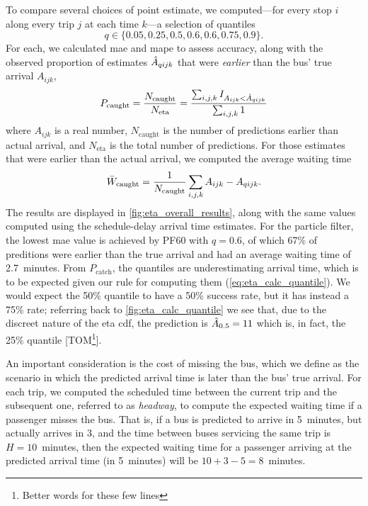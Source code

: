 To compare several choices of point estimate, we computed---for every stop $i$ along every trip $j$ at each time $k$---a selection of quantiles
\[
  q \in \{0.05, 0.25, 0.5, 0.6, 0.6, 0.75, 0.9\}.
\]
For each, we calculated \gls{mae} and \gls{mape} to assess accuracy, along with the observed proportion of estimates $\hat{A}_{qijk}$ that were \emph{earlier} than the bus' true arrival $A_{ijk}$,
\begin{equation}
\label{eq:pr_bus_caught}
P_\text{caught} = \frac{N_\text{caught}}{N_\text{eta}}
= \frac{\sum_{i,j,k} I_{A_{ijk} < \hat{A}_{qijk}}}{\sum_{i,j,k} 1}
\end{equation}
where $A_{ijk}$ is a real number, $N_\text{caught}$ is the number of predictions earlier than actual arrival, and $N_\text{eta}$ is the total number of predictions. For those estimates that were earlier than the actual arrival, we computed the average waiting time
\begin{equation}
\label{eq:avg_wait_time}
\bar W_\text{caught} =
\frac{1}{N_\text{caught}} \sum_{i,j,k} A_{ijk} - A_{qijk}.
\end{equation}
The results are displayed in \cref{fig:eta_overall_results}, along with the same values computed using the schedule-delay arrival time estimates. For the particle filter, the lowest \gls{mae} value is achieved by PF60 with $q = 0.6$, of which 67\% of preditions were earlier than the true arrival and had an average waiting time of 2.7~minutes. From $P_\text{catch}$, the quantiles are underestimating arrival time, which is to be expected given our rule for computing them (\cref{eq:eta_calc_quantile}). We would expect the 50\% quantile to have a 50\% success rate, but it has instead a 75\% rate; referring back to \cref{fig:eta_calc_quantile} we see that, due to the discreet nature of the \gls{eta} \gls{cdf}, the prediction is $\hat{A}_{0.5} = 11$ which is, in fact, the 25\% quantile [TOM\footnote{Better words for these few lines}].



An important consideration is the cost of missing the bus, which we define as the scenario in which the predicted arrival time is later than the bus' true arrival. For each trip, we computed the scheduled time between the current trip and the subsequent one, referred to as \emph{headway}, to compute the expected waiting time if a passenger misses the bus. That is, if a bus is predicted to arrive in 5~minutes, but actually arrives in 3, and the time between buses servicing the same trip is $H = 10$~minutes, then the expected waiting time for a passenger arriving at the predicted arrival time (in 5~minutes) will be $10+3-5=8$~minutes.


